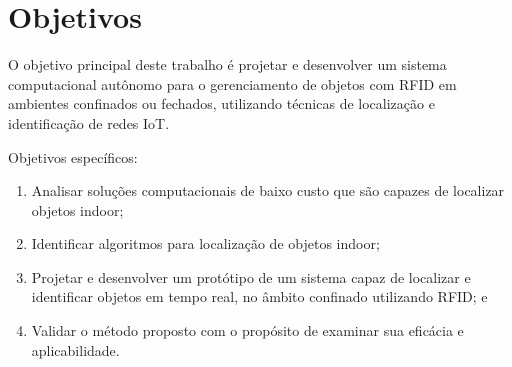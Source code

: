 \section{Objetivos}
O objetivo principal deste trabalho é projetar e desenvolver um sistema computacional autônomo para o gerenciamento de objetos com RFID
em ambientes confinados ou fechados, utilizando técnicas de localização e identificação de redes IoT.


Objetivos específicos:
\begin{enumerate}

    \item Analisar soluções computacionais de baixo custo que são capazes de localizar objetos indoor;
    
    \item Identificar algoritmos para localização de objetos indoor;
    
    
    
    \item Projetar e desenvolver um protótipo de um sistema capaz de localizar e identificar objetos em tempo real, no âmbito confinado utilizando RFID; e
    
    \item Validar o método proposto com o propósito de examinar sua eficácia e aplicabilidade.
\end{enumerate}


